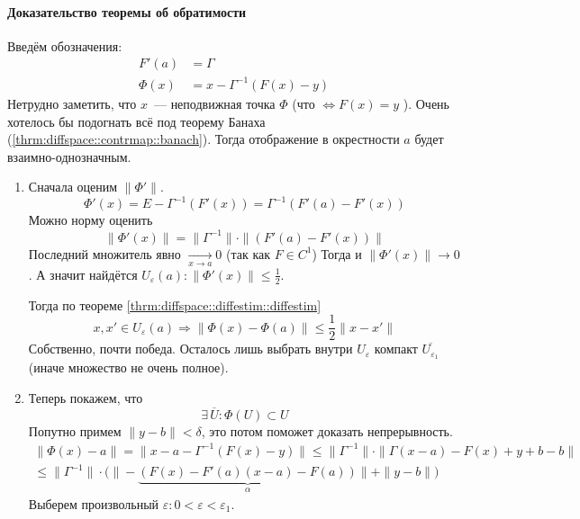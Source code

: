 \documentclass[12pt,timbord]{../../../notes}
\begin{document}
\paragraph{Доказательство теоремы об обратимости}
\label{par:diffspace::invmapproof}

\begin{ittproof}
  Введём обозначения:
  \begin{align*}
    F'(a) &= \Gamma\\
    \Phi(x) &= x - \Gamma^{-1} (F(x) - y)
  \end{align*}
  Нетрудно заметить, что $x$~--- неподвижная точка $\Phi$ (что $\Leftrightarrow F(x)=y$ ).
  Очень хотелось бы подогнать всё под теорему Банаха (\ref{thrm:diffspace::contrmap::banach}).
  Тогда отображение в окрестности $a$ будет взаимно-однозначным.

  \begin{enumerate}
    \item Сначала оценим $\|\Phi'\|$.
      \[
        \Phi'(x) = E - \Gamma^{-1} (F'(x)) = \Gamma^{-1} (F'(a) - F'(x))
      \]
      Можно норму оценить
      \[
        \|\Phi'(x)\| = \| \Gamma^{-1} \| \cdot \| (F'(a) - F'(x)) \|
      \]
      Последний множитель явно $\xrightarrow[x\to a]{} 0$ (так как $F\in C^1$)
      Тогда и $\|\Phi'(x)\|\to 0$. А значит найдётся $U_\varepsilon(a) \colon 
      \|\Phi'(x)\| \leqslant \frac{1}{2}$.
      
      Тогда по теореме \ref{thrm:diffspace::diffestim::diffestim} 
      \[
        x, x' \in U_\varepsilon(a) \Rightarrow \| \Phi(x) - \Phi(a)\| \leqslant \frac{1}{2}
        \|x-x'\|
      \]
      Собственно, почти победа. Осталось лишь выбрать внутри $U_\varepsilon$ компакт
      $\overline{U_{\varepsilon_1}}$ (иначе множество не очень полное).

    \item Теперь покажем, что 
      \[
        \exists\, \overline{U} \colon \Phi(U) \subset U  
      \]
      Попутно примем $\|y-b\| < \delta$, это потом поможет доказать непрерывность.
      \[
        \begin{split}
          \|\Phi(x) - a\| = \| x - a - \Gamma^{-1}(F(x)-y)\| 
          \leqslant \|\Gamma^{-1}\| \cdot \| \Gamma (x-a) - F(x) + y + b - b\| \\ 
          \leqslant \|\Gamma^{-1}\| 
          \cdot \bigl(\| - \underbrace{( F(x) - F'(a)(x-a) - F(a) )}_{\alpha}\| + \| y - b\| \bigr)
        \end{split}
      \]
      Выберем произвольный $\varepsilon \colon 0 < \varepsilon < \varepsilon_1$.
      

\end{enumerate}
\end{ittproof}
\end{document}
